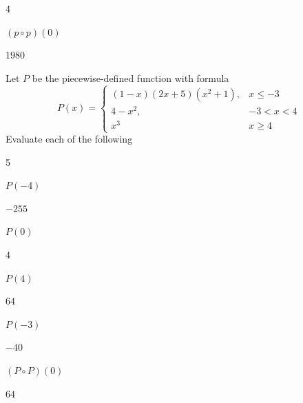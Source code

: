 \begin{exercises}
\begin{problem}
\begin{multicols}{4}
\begin{subproblem}
		 \end{subproblem}
		 \begin{subproblem}
			 $(p\circ p)(0)$
			 \begin{shortsolution}
				 $1980$
			 \end{shortsolution}
		 \end{subproblem}
	 \end{multicols}
	 \end{problem}
	 \begin{problem}
	 Let $P$ be the piecewise-defined function with formula
	 \[
		 P(x)=\begin{cases}
			 (1-x)(2x+5)(x^2+1), & x\leq -3 \\
			 4-x^2,              & -3<x < 4 \\
			 x^3                 & x\geq 4
		 \end{cases}
	 \]
	 Evaluate each of the following
	 \begin{multicols}{5}
		 \begin{subproblem}
			 $P(-4)$
			 \begin{shortsolution}
				 $-255$
			 \end{shortsolution}
		 \end{subproblem}
		 \begin{subproblem}
			 $P(0)$
			 \begin{shortsolution}
				 $4$
			 \end{shortsolution}
		 \end{subproblem}
		 \begin{subproblem}
			 $P(4)$
			 \begin{shortsolution}
				 $64$
			 \end{shortsolution}
		 \end{subproblem}
		 \begin{subproblem}
			 $P(-3)$
			 \begin{shortsolution}
				 $-40$
			 \end{shortsolution}
		 \end{subproblem}
		 \begin{subproblem}
			 $(P\circ P)(0)$
			 \begin{shortsolution}
				 $64$
			 \end{shortsolution}
		 \end{subproblem}
	 \end{multicols}
	 \end{problem}


\end{exercises}
